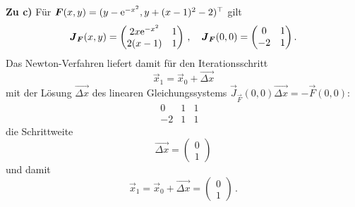 {\bigskip
\textbf{Zu c)} F\"ur $\boldsymbol F(x,y)= (y -\mathrm{e}^{-x^2},y +(x-1)^2-2)^\top$ gilt
$$
\boldsymbol J_{\boldsymbol{F}}(x,y) = \begin{pmatrix} 2x\mathrm{e}^{-x^2} & 1 \\ 2(x-1)  & 1 \end{pmatrix}\,, \quad \boldsymbol J_{\boldsymbol{F}}(0,0) = \begin{pmatrix}  0 & 1 \\ -2  & 1 \end{pmatrix}. 
$$
Das Newton-Verfahren liefert damit f\"ur den Iterationsschritt
$$\vec x_1=\vec x_0 + \vec {\Delta x}$$
mit der L\"osung $\vec{\Delta x}$ des linearen Gleichungssystems $\vec J_{\vec F}(0,0)\vec{\Delta x}=-\vec F(0,0):$
$$\begin{array}{rr|r|l}
  0  &  1  &  1 & \\
 -2  &  1  &  1 & 
\end{array}$$
die Schrittweite $$\vec{\Delta x}=\begin{pmatrix}0 \\1\end{pmatrix}$$
und damit
$$
\vec x_1 = \vec x_0+ \vec{\Delta x} = \boxed{\begin{pmatrix} 0\\ 1 \end{pmatrix}}\,.
$$
}


% 


